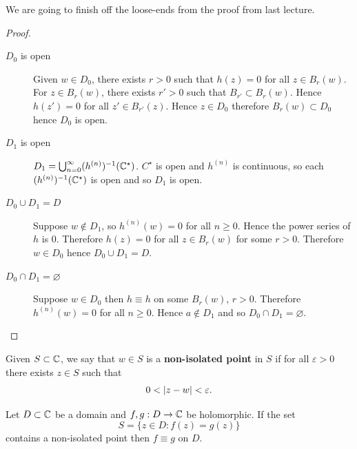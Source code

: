 We are going to finish off the loose-ends from the proof from
last lecture.
\begin{proof}
    \hfill
    \begin{description}
        \item[$D_0$ is open]
            Given $w \in D_0$, there exists $r>0$ such that $h(z) = 0$
            for all $z \in B_r(w)$. 
            For $z \in B_r(w)$, there exists $r' > 0$ such that
            $B_{r'} \subset B_r(w)$. Hence $h(z') = 0$ for all
            $z' \in B_{r'}(z)$. 
            Hence $z \in D_0$
            therefore $B_r(w) \subset D_0$ hence $D_0$ is open.
            
        \item[$D_1$ is open]
            $D_1 = \bigcup_{n = 0}^\infty (h^{(n)})^{-1}(\mathbb{C}^\star)$.
            $C^\star$ is open and $h^{(n)}$ is continuous, so
            each $(h^{(n)})^{-1}(\mathbb{C}^\star)$ is open and so
            $D_1$ is open.

        \item[$D_0 \cup D_1 = D$] Suppose $w \not\in D_1$, so
            $h^{(n)}(w) = 0$ for all $n \geq 0$. Hence
            the power series of $h$ is $0$.
            Therefore $h(z) = 0$ for all $z \in B_r(w)$
            for some $r > 0$.
            Therefore $w \in D_0$ hence $D_0 \cup D_1 = D$.

        \item[$D_0 \cap D_1 = \varnothing$]
            Suppose $w \in D_0$ then $h \equiv h$ on some
            $B_r(w)$, $r>0$. Therefore
            $h^{(n)}(w) = 0$ for all $n \geq 0$.
            Hence $a \not\in D_1$ and so $D_0 \cap D_1 = \varnothing$.
    \end{description}
\end{proof}

\begin{definition}[]
    Given $S \subset \mathbb{C}$, we say that $w \in S$ is a
    \textbf{non-isolated point} in $S$ if
    for all $\varepsilon > 0$ there exists $z \in S$ such that
    \[
        0 < \left\lvert z - w\right\rvert < \varepsilon.
    \]
\end{definition}

\begin{theorem}[Identity]
    Let $D \subset \mathbb{C}$ be a domain and $f,g: D\to \mathbb{C}$ be holomorphic.
    If the set 
    \[
        S = \{z \in D: f(z) = g(z)\}
    \]
    contains a non-isolated point then $f \equiv g$ on $D$.
\end{theorem}

